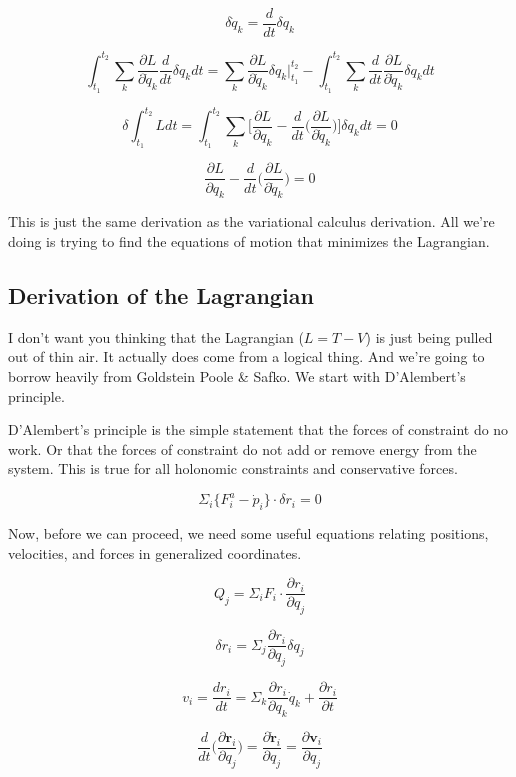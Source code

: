 \documentclass{article}
\begin{document}
$$\delta \dot{ q }_k = \frac{ d }{ dt } \delta q_k$$

$$\int_{t_1}^{t_2} \sum_k \frac{ \partial L }{ \partial \dot{ q }_k }  \frac{ d }{ dt } \delta q_k dt = \sum_k \frac{ \partial L }{ \partial \dot{ q }_k } \delta q_k \Big|_{t_1}^{t_2} - \int_{t_1}^{t_2} \sum_k \frac{ d }{ dt } \frac{ \partial L }{ \partial \dot{ q }_k } \delta q_k dt$$

$$\delta \int_{t_1}^{t_2} L dt = \int_{t_1}^{t_2} \sum_k \Big[ \frac{ \partial L }{ \partial q_k } - \frac{ d }{ dt } \Big( \frac{ \partial L }{ \partial \dot{ q }_k } \Big) \Big] \delta q_k dt = 0$$

$$\frac{ \partial L }{ \partial q_k } - \frac{ d }{ dt } \Big( \frac{ \partial L }{ \partial \dot{ q }_k } \Big) = 0$$

This is just the same derivation as the variational calculus derivation.  All we're doing is trying to find the equations of motion that minimizes the Lagrangian.

%
%
%
\subsection{Derivation of the Lagrangian}

I don't want you thinking that the Lagrangian ($L= T - V$) is just being pulled out of thin air.  It actually does come from a logical thing.  And we're going to borrow heavily from Goldstein Poole \& Safko.  We start with D'Alembert's principle.

D'Alembert's principle is the simple statement that the forces of constraint do no work.  Or that the forces of constraint do not add or remove energy from the system.  This is true for all holonomic constraints and conservative forces.

$$\Sigma_i \{ F^a_i - \dot{ p }_i \} \cdot \delta r_i = 0$$

Now, before we can proceed, we need some useful equations relating positions, velocities, and forces in generalized coordinates.

$$Q_j = \Sigma_i F_i \cdot \frac{ \partial r_i }{ \partial q_j }$$

$$\delta r_i = \Sigma_j \frac{ \partial r_i }{ \partial q_j } \delta q_j$$

$$v_i = \frac{ d r_i }{ dt } = \Sigma_k \frac{ \partial r_i }{ \partial q_k } \dot{ q }_k + \frac{ \partial r_i }{ \partial t }$$

$$\frac{ d }{ dt } \Big( \frac{ \partial \mathbf{ r }_i }{ \partial q_j } \Big) = \frac{ \partial \dot{ \mathbf{ r } }_i }{ \partial q_j } = \frac{ \partial \mathbf{ v }_i }{ \partial q_j }$$
\end{document}
